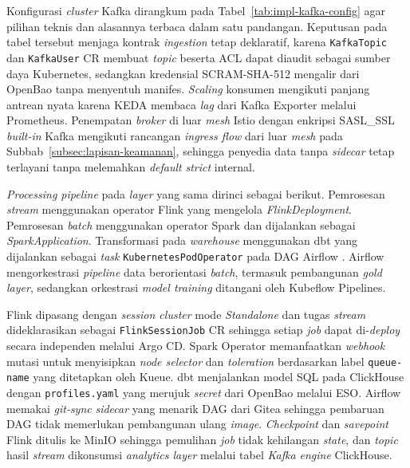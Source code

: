 Konfigurasi \textit{cluster} Kafka dirangkum pada Tabel~\ref{tab:impl-kafka-config} agar pilihan teknis dan alasannya terbaca dalam satu pandangan. Keputusan pada tabel tersebut menjaga kontrak \textit{ingestion} tetap deklaratif, karena \texttt{KafkaTopic} dan \texttt{KafkaUser} CR membuat \textit{topic} beserta ACL dapat diaudit sebagai sumber daya Kubernetes, sedangkan kredensial SCRAM-SHA-512 mengalir dari OpenBao tanpa menyentuh manifes. \textit{Scaling} konsumen mengikuti panjang antrean nyata karena KEDA membaca \textit{lag} dari Kafka Exporter melalui Prometheus. Penempatan \textit{broker} di luar \textit{mesh} Istio dengan enkripsi SASL\_SSL \textit{built-in} Kafka mengikuti rancangan \textit{ingress flow} dari luar \textit{mesh} pada Subbab~\ref{subsec:lapisan-keamanan}, sehingga penyedia data tanpa \textit{sidecar} tetap terlayani tanpa melemahkan \textit{default} \textit{strict} internal.



\textit{Processing pipeline} pada \textit{layer} yang sama dirinci sebagai berikut. Pemrosesan \textit{stream} menggunakan operator Flink yang mengelola \textit{FlinkDeployment}. Pemrosesan \textit{batch} menggunakan operator Spark dan dijalankan sebagai \textit{SparkApplication}. Transformasi pada \textit{warehouse} menggunakan dbt yang dijalankan sebagai \textit{task} \texttt{KubernetesPodOperator} pada DAG Airflow \autocite{airflow2024}. Airflow mengorkestrasi \textit{pipeline} data berorientasi \textit{batch}, termasuk pembangunan \textit{gold layer}, sedangkan orkestrasi \textit{model training} ditangani oleh Kubeflow Pipelines.

Flink dipasang dengan \textit{session cluster} mode \textit{Standalone} dan tugas \textit{stream} dideklarasikan sebagai \texttt{FlinkSessionJob} CR sehingga setiap \textit{job} dapat di-\textit{deploy} secara independen melalui Argo CD. Spark Operator memanfaatkan \textit{webhook} mutasi untuk menyisipkan \textit{node selector} dan \textit{toleration} berdasarkan label \texttt{queue-name} yang ditetapkan oleh Kueue. dbt menjalankan model SQL pada ClickHouse dengan \texttt{profiles.yaml} yang merujuk \textit{secret} dari OpenBao melalui ESO. Airflow memakai \textit{git-sync} \textit{sidecar} yang menarik DAG dari Gitea sehingga pembaruan DAG tidak memerlukan pembangunan ulang \textit{image}. \textit{Checkpoint} dan \textit{savepoint} Flink ditulis ke MinIO sehingga pemulihan \textit{job} tidak kehilangan \textit{state}, dan \textit{topic} hasil \textit{stream} dikonsumsi \textit{analytics layer} melalui tabel \textit{Kafka engine} ClickHouse.

